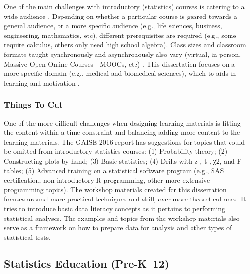 \documentclass[010-intro.tex]{subfiles}
\begin{document}
    One of the main challenges with introductory (statistics) courses is catering to a wide audience
    \cite{gaise2016}.
    Depending on whether a particular course is geared towards a general audience, or a more specific audience
    (e.g., life sciences, business, engineering, mathematics, etc),
    different prerequisites are required
    (e.g., some require calculus, others only need high school algebra).
    Class sizes and classroom formats taught synchronously and asynchronously also vary
    (virtual, in-person, Massive Open Online Courses - MOOCs, etc)
    \cite{gaise2016}.
    This dissertation focuses on a more specific domain (e.g., medical and biomedical sciences),
    which to aids in learning and motivation
    \cite{ambrose2010learning, wilson2019teaching, krossDemocratizationDataScience2020}.

    \subsubsection{Things To Cut}

        One of the more difficult challenges when designing learning materials is fitting the content within a time constraint
        and balancing adding more content to the learning materials. %
        The GAISE 2016 report has suggestions for topics that could be omitted from introductory statistics courses:
        (1) Probability theory;
        (2) Constructing plots by hand;
        (3) Basic statistics;
        (4) Drills with z-, t-, χ2, and F-tables;
        (5) Advanced training on a statistical software program
            (e.g., SAS certification, non-introductory R programming, other more extensive programming topics).
        The workshop materials created for this dissertation
        focuses around more practical techniques and skill, over more theoretical ones.
        It tries to introduce basic data literacy concepts as it pertains to performing statistical analyses.
        The examples and topics from the workshop materials
        also serve as a framework on how to prepare data for analysis and other types of statistical tests.

\subsection{Statistics Education (Pre-K–12)}
\label{sse:statsk12}
\end{document}

